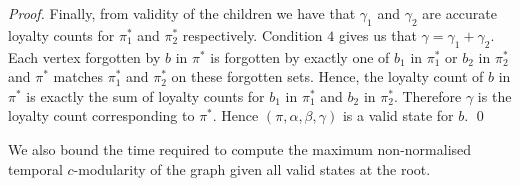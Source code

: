 \documentclass[runningheads]{llncs}
\begin{document}
\begin{proof}
    Finally, from validity of the children we have that $\gamma_1$ and $\gamma_2$ are accurate loyalty counts for $\pi^*_1$ and $\pi^*_2$ respectively. Condition $4$ gives us that $\gamma=\gamma_1+\gamma_2$. Each vertex forgotten by $b$ in $\pi^*$ is forgotten by exactly one of $b_1$ in $\pi^*_1$ or $b_2$ in $\pi^*_2$ and $\pi^*$ matches $\pi^*_1$ and $\pi^*_2$ on these forgotten sets. Hence, the loyalty count of $b$ in $\pi^*$ is exactly the sum of loyalty counts for $b_1$ in $\pi^*_1$ and $b_2$ in $\pi^*_2$. Therefore $\gamma$ is the loyalty count corresponding to $\pi^*$.
    Hence $(\pi,\alpha,\beta,\gamma)$ is a valid state for $b$. \qed
\end{proof}

We also bound the time required to compute the maximum non-normalised temporal $c$-modularity of the graph given all valid states at the root.
\end{document}
